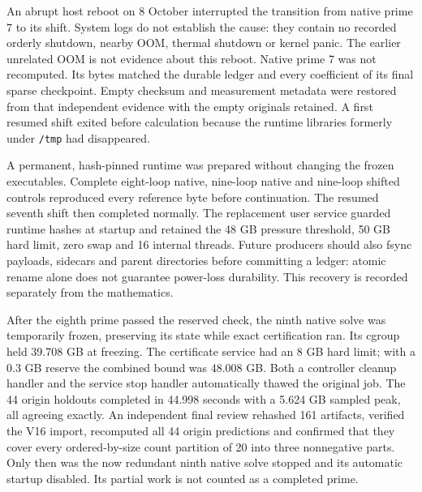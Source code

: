 \documentclass[11pt]{article}
\begin{document}
An abrupt host reboot on 8 October interrupted the transition from native
prime 7 to its shift. System logs do not establish the cause: they contain
no recorded orderly shutdown, nearby OOM, thermal shutdown or kernel panic.
The earlier unrelated OOM is not evidence about this reboot. Native prime 7
was not recomputed. Its bytes matched the durable ledger and every
coefficient of its final sparse checkpoint. Empty checksum and measurement
metadata were restored from that independent evidence with the empty
originals retained. A first resumed shift exited before calculation because
the runtime libraries formerly under \texttt{/tmp} had disappeared.

A permanent, hash-pinned runtime was prepared without changing the frozen
executables. Complete eight-loop native, nine-loop native and nine-loop
shifted controls reproduced every reference byte before continuation.
The resumed seventh shift then completed normally. The replacement user
service guarded runtime hashes at startup and retained the 48 GB pressure
threshold, 50 GB hard limit, zero swap and 16 internal threads. Future
producers should also fsync payloads, sidecars and parent directories before
committing a ledger: atomic rename alone does not guarantee power-loss
durability. This recovery is recorded separately from the mathematics.

After the eighth prime passed the reserved check, the ninth native solve
was temporarily frozen, preserving its state while exact certification ran.
Its cgroup held 39.708 GB at freezing. The certificate service had an 8 GB
hard limit; with a 0.3 GB reserve the combined bound was 48.008 GB. Both a
controller cleanup handler and the service stop handler automatically thawed
the original job. The 44 origin holdouts completed in 44.998 seconds with a
5.624 GB sampled peak, all agreeing exactly. An independent final review
rehashed 161 artifacts, verified the V16 import, recomputed all 44 origin
predictions and confirmed that they cover every ordered-by-size count
partition of 20 into three nonnegative parts. Only then was the now
redundant ninth native solve stopped and its automatic startup disabled.
Its partial work is not counted as a completed prime.
\end{document}
